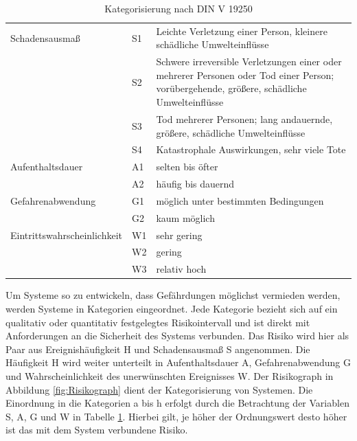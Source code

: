 \begin{table}[htpb]
	\scriptsize
	\caption[Kategorisierung nach DIN V 19250]{Kategorisierung nach DIN V 19250 \parencite[S. 52]{Hillenbrand.2012}}\label{tab:Kategorisierung nach DIN V 19250}
	\centering
	\begin{tabular}{l l p{7cm}}
		\toprule
		Schadensausmaß & S1 & Leichte Verletzung einer Person, kleinere schädliche Umwelteinflüsse\\
		& S2 & Schwere irreversible Verletzungen einer oder mehrerer Personen oder Tod einer Person; vorübergehende, größere, schädliche Umwelteinflüsse\\
		& S3 & Tod mehrerer Personen; lang andauernde, größere, schädliche Umwelteinflüsse\\
		& S4 & Katastrophale Auswirkungen, sehr viele Tote\\
		\midrule
		Aufenthaltsdauer & A1 & selten bis öfter\\
		& A2 & häufig bis dauernd\\
		\midrule
		Gefahrenabwendung & G1 & möglich unter bestimmten Bedingungen\\
		& G2 & kaum möglich\\
		\midrule
		Eintrittswahrscheinlichkeit & W1 & sehr gering\\
		& W2 & gering\\
		& W3 & relativ hoch\\
		\bottomrule
	\end{tabular}
\end{table}

Um Systeme so zu entwickeln, dass Gefährdungen möglichst vermieden werden, werden Systeme in Kategorien eingeordnet. Jede Kategorie bezieht sich auf ein qualitativ oder quantitativ festgelegtes Risikointervall und ist direkt mit Anforderungen an die Sicherheit des Systems verbunden. Das Risiko wird hier als Paar aus Ereignishäufigkeit H und Schadensausmaß S angenommen. Die Häufigkeit H wird weiter unterteilt in Aufenthaltsdauer A, Gefahrenabwendung G und Wahrscheinlichkeit des unerwünschten Ereignisses W. Der Risikograph in Abbildung \ref{fig:Risikograph} dient der Kategorisierung von Systemen. Die Einordnung in die Kategorien a bis h erfolgt durch die Betrachtung der Variablen S, A, G und W in Tabelle \ref{tab:Kategorisierung nach DIN V 19250}. Hierbei gilt, je höher der Ordnungswert desto höher ist das mit dem System verbundene Risiko.


